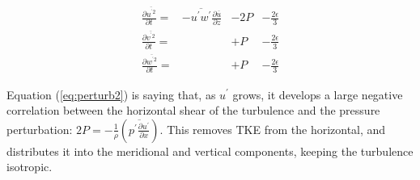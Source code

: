 \documentclass[12pt]{article}
\begin{document}
\begin{subequations}
\label{eq:perturb2}
\begin{align}
  \frac{\partial  \overline{ u^{^\prime 2}}}{\partial t} = & 
- \overline{ u^\prime w^\prime  } \frac{\partial  \overline{u } }{\partial  z} &
-  2 P & - \frac{2 \epsilon }{3} \\
  \frac{\partial  \overline{ v^{^\prime 2}}}{\partial t} = & \text{ }
  &
+ P & - \frac{2 \epsilon }{3}\\
  \frac{\partial  \overline{ w^{^\prime 2}}}{\partial t} = & \text{ }
  & + P  & - \frac{2 \epsilon }{3}
\end{align}
\end{subequations}

Equation (\ref{eq:perturb2}) is saying that, as $u^\prime$ grows, it
develops a large negative correlation between the horizontal shear
of the turbulence and the pressure perturbation:
$2P = - \frac{ 1}{\rho} \left (    \overline{ p^\prime \frac{ \partial u^\prime }{\partial x}  }  \right )$.  This removes TKE from the horizontal, and
distributes it into the meridional and vertical components, 
keeping the turbulence isotropic.
\end{document}
